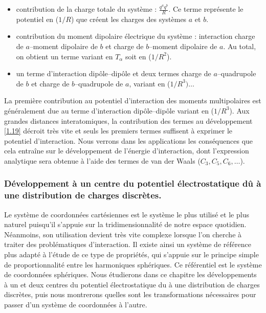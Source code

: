 \documentclass[12pt,a4paper]{book}
\begin{document}
	\begin{itemize}
		\item contribution de la charge totale du système : $\frac{q^{a}q^{b}}{R}$. Ce terme représente le potentiel en ($1/R$) que créent les charges des systèmes $a$ et $b$.
		\item contribution du moment dipolaire électrique du système : interaction charge de $a$--moment dipolaire de $b$ et charge de $b$--moment dipolaire de $a$. Au total, on obtient un terme variant en $T_{\alpha}$ soit en ($1/R^{2}$).	
		\item un terme d'interaction dipôle--dipôle et deux termes charge de $a$--quadrupole de $b$ et charge de $b$--quadrupole de $a$, variant en ($1/R^{3}) \ldots$
	\end{itemize}
	
	La première contribution au potentiel d'interaction des moments multipolaires est généralement due au terme d'interaction dipôle--dipôle variant en ($1/R^{3}$). Aux grandes distances interatomiques, la contribution des termes au développement \ref{1.19} décroit très vite et seuls les premiers termes suffisent à exprimer le potentiel d'interaction. Nous verrons dans les applications les conséquences que cela entraîne sur le développement de l'énergie d'interaction, dont l'expression analytique sera obtenue à l'aide des termes de van der Waals ($C_{3}, C_{5}, C_{6}, \ldots$).\\
	
	
	\subsubsection{Développement à un centre du potentiel électrostatique dû à une distribution de charges discrètes.}
	
	Le système de coordonnées cartésiennes est le système le plus utilisé et le plus naturel puisqu'il s'appuie sur la tridimensionnalité de notre espace quotidien. Néanmoins, son utilisation devient très vite complexe lorsque l'on cherche à traiter des problématiques d'interaction. Il existe ainsi un système de référence plus adapté à l'étude de ce type de propriétés, qui s'appuie sur le principe simple de proportionnalité entre les harmoniques sphériques. Ce référentiel est le système de coordonnées sphériques. Nous étudierons dans ce chapitre les développements à un et deux centres du potentiel électrostatique du à une distribution de charges discrètes, puis nous montrerons quelles sont les transformations nécessaires pour passer d'un système de coordonnées à l'autre.\\
	
\end{document}
